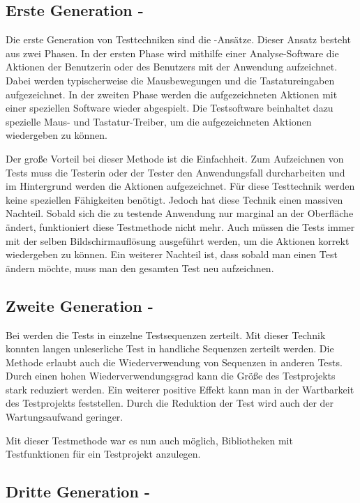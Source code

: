 \subsection{Erste Generation - }

Die erste Generation von Testtechniken sind die -Ansätze. Dieser Ansatz besteht aus zwei Phasen. In der ersten Phase wird mithilfe einer Analyse-Software die Aktionen der Benutzerin oder des Benutzers mit der Anwendung aufzeichnet. Dabei werden typischerweise die Mausbewegungen und die Tastatureingaben aufgezeichnet. In der zweiten Phase werden die aufgezeichneten Aktionen mit einer speziellen Software wieder abgespielt. Die Testsoftware beinhaltet dazu spezielle Maus- und Tastatur-Treiber, um die aufgezeichneten Aktionen wiedergeben zu können.

\SuperPar
Der große Vorteil bei dieser Methode ist die Einfachheit. Zum Aufzeichnen von Tests muss die Testerin oder der Tester den Anwendungsfall durcharbeiten und im Hintergrund werden die Aktionen aufgezeichnet. Für diese Testtechnik werden keine speziellen Fähigkeiten benötigt. Jedoch hat diese Technik einen massiven Nachteil. Sobald sich die zu testende Anwendung nur marginal an der Oberfläche ändert, funktioniert diese Testmethode nicht mehr. Auch müssen die Tests immer mit der selben Bildschirmauflösung ausgeführt werden, um die Aktionen korrekt wiedergeben zu können. Ein weiterer Nachteil ist, dass sobald man einen Test ändern möchte, muss man den gesamten Test neu aufzeichnen.

\subsection{Zweite Generation - }

Bei  werden die Tests in einzelne Testsequenzen zerteilt. Mit dieser Technik konnten langen unleserliche Test in handliche Sequenzen zerteilt werden. Die Methode erlaubt auch die Wiederverwendung von Sequenzen in anderen Tests. Durch einen hohen Wiederverwendungsgrad kann die Größe des Testprojekts stark reduziert werden. Ein weiterer positive Effekt kann man in der Wartbarkeit des Testprojekts feststellen. Durch die Reduktion der Test wird auch der der Wartungsaufwand geringer.

\SuperPar
Mit dieser Testmethode war es nun auch möglich, Bibliotheken mit Testfunktionen für ein Testprojekt anzulegen. 

\subsection{Dritte Generation - }

